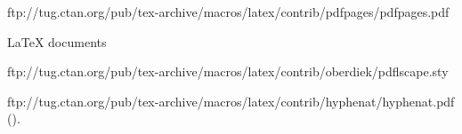 \providecommand*{\figrefname}{Abbildung }
\newcommand*{\figref}[1]{%
\hyperref[fig:#1]{\figrefname{}}\ref{fig:#1}%
}
\providecommand*{\tabrefname}{Tabelle~}
\newcommand*{\tabref}[1]{%
\hyperref[tab:#1]{\tabrefname{}}\ref{tab:#1}%
}
\providecommand*{\secrefname}{Abschnitt }
\newcommand*{\secref}[1]{%
\hyperref[sec:#1]{\secrefname{}}\ref{sec:#1}%
}
\providecommand*{\chaprefname}{Kapitel~}
\newcommand*{\chapref}[1]{%
\hyperref[chap:#1]{\chaprefname{}}\ref{chap:#1}%
}

ftp://tug.ctan.org/pub/tex-archive/macros/latex/contrib/pdfpages/pdfpages.pdf
\usepackage{pdfpages} %
LaTeX documents

ftp://tug.ctan.org/pub/tex-archive/macros/latex/contrib/oberdiek/pdflscape.sty
%
\LoadPackagesNow %

ftp://tug.ctan.org/pub/tex-archive/macros/latex/contrib/hyphenat/hyphenat.pdf
(\textt).


